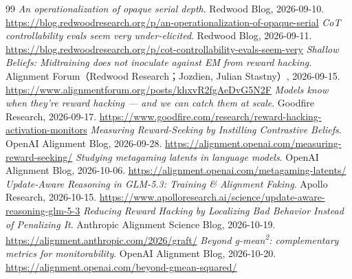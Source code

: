 \begin{thebibliography}{99}
 \textit{An operationalization of opaque serial depth}. Redwood Blog, 2026-09-10. \url{https://blog.redwoodresearch.org/p/an-operationalization-of-opaque-serial}
 \textit{CoT controllability evals seem very under-elicited}. Redwood Blog, 2026-09-11. \url{https://blog.redwoodresearch.org/p/cot-controllability-evals-seem-very}
 \textit{Shallow Beliefs: Midtraining does not inoculate against EM from reward hacking}. Alignment Forum（Redwood Research；Jozdien, Julian Stastny）, 2026-09-15. \url{https://www.alignmentforum.org/posts/khxvR2fgAeDvG5N2F}
 \textit{Models know when they’re reward hacking --- and we can catch them at scale}. Goodfire Research, 2026-09-17. \url{https://www.goodfire.com/research/reward-hacking-activation-monitors}
 \textit{Measuring Reward-Seeking by Instilling Contrastive Beliefs}. OpenAI Alignment Blog, 2026-09-28. \url{https://alignment.openai.com/measuring-reward-seeking/}
 \textit{Studying metagaming latents in language models}. OpenAI Alignment Blog, 2026-10-06. \url{https://alignment.openai.com/metagaming-latents/}
 \textit{Update-Aware Reasoning in GLM-5.3: Training \& Alignment Faking}. Apollo Research, 2026-10-15. \url{https://www.apolloresearch.ai/science/update-aware-reasoning-glm-5-3}
 \textit{Reducing Reward Hacking by Localizing Bad Behavior Instead of Penalizing It}. Anthropic Alignment Science Blog, 2026-10-19. \url{https://alignment.anthropic.com/2026/graft/}
 \textit{Beyond g-mean\textsuperscript{2}: complementary metrics for monitorability}. OpenAI Alignment Blog, 2026-10-20. \url{https://alignment.openai.com/beyond-gmean-squared/}
\end{thebibliography}
